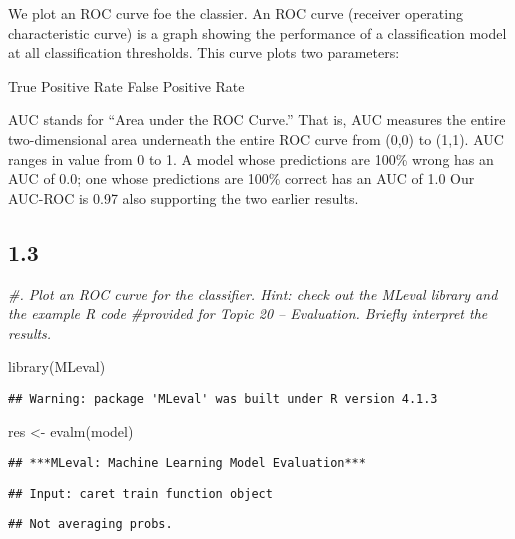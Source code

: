 \documentclass[
]{article}
\newenvironment{Shaded}{\begin{snugshade}}{\end{snugshade}}
\newcommand{\CommentTok}[1]{\textcolor[rgb]{0.56,0.35,0.01}{\textit{#1}}}
\newcommand{\FunctionTok}[1]{\textcolor[rgb]{0.00,0.00,0.00}{#1}}
\newcommand{\NormalTok}[1]{#1}
\newcommand{\OtherTok}[1]{\textcolor[rgb]{0.56,0.35,0.01}{#1}}
\begin{document}
We plot an ROC curve foe the classier. An ROC curve (receiver operating
characteristic curve) is a graph showing the performance of a
classification model at all classification thresholds. This curve plots
two parameters:

True Positive Rate False Positive Rate

AUC stands for ``Area under the ROC Curve.'' That is, AUC measures the
entire two-dimensional area underneath the entire ROC curve from (0,0)
to (1,1). AUC ranges in value from 0 to 1. A model whose predictions are
100\% wrong has an AUC of 0.0; one whose predictions are 100\% correct
has an AUC of 1.0 Our AUC-ROC is 0.97 also supporting the two earlier
results.

\hypertarget{section-2}{%
\subsection{1.3}\label{section-2}}

\begin{Shaded}
\begin{Highlighting}[]
\CommentTok{\#. Plot an ROC curve for the classifier. Hint: check out the MLeval library and the example R code}
\CommentTok{\#provided for Topic 20 – Evaluation. Briefly interpret the results.}



\FunctionTok{library}\NormalTok{(MLeval)}
\end{Highlighting}
\end{Shaded}

\begin{verbatim}
## Warning: package 'MLeval' was built under R version 4.1.3
\end{verbatim}

\begin{Shaded}
\begin{Highlighting}[]
\NormalTok{res }\OtherTok{\textless{}{-}} \FunctionTok{evalm}\NormalTok{(model)}
\end{Highlighting}
\end{Shaded}

\begin{verbatim}
## ***MLeval: Machine Learning Model Evaluation***
\end{verbatim}

\begin{verbatim}
## Input: caret train function object
\end{verbatim}

\begin{verbatim}
## Not averaging probs.
\end{verbatim}
\end{document}

